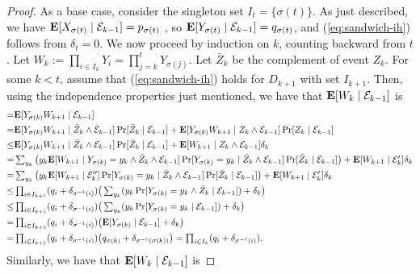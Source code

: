 \begin{proof}
As a base case, consider the singleton set $I_t=\{\sigma(t)\}$. As just described, we have $\text{\bf E}[X_{\sigma(t)}\mid\mathcal{E}_{k-1}]=p_{\sigma(t)}$ , so $\text{\bf E}[Y_{\sigma(t)}\mid\mathcal{E}_{k-1}]=q_{\sigma(t)}$, and (\ref{eq:sandwich-ih}) follows from $\delta_t=0$.
We now proceed by induction on $k$, counting backward from $t$. Let $W_k:=\prod_{i\in{I_k}} Y_i=\prod_{j=k}^t Y_{\sigma(j)}$. Let $\bar Z_k$ be the complement of event $Z_k$.  For some $k<t$, assume that (\ref{eq:sandwich-ih}) holds for $D_{k+1}$ with set $I_{k+1}$. Then, using the independence properties just mentioned, we have that $\text{\bf E}[W_k\mid\mathcal{E}_{k-1}]$ is
\begin{align*}
=&\text{\bf E}[Y_{\sigma(k)} W_{k+1}\mid\mathcal{E}_{k-1}] 
\\=& \text{\bf E}[Y_{\sigma(k)} W_{k+1}\mid\bar Z_k\land\mathcal{E}_{k-1}]\Pr[\bar Z_k\mid\mathcal{E}_{k-1}]
	+\text{\bf E}[Y_{\sigma(k)} W_{k+1}\mid Z_k\land\mathcal{E}_{k-1}]\Pr[Z_k\mid\mathcal{E}_{k-1}] 
\\\le& \text{\bf E}[Y_{\sigma(k)} W_{k+1}\mid\bar Z_k\land\mathcal{E}_{k-1}]\Pr[\bar Z_k\mid\mathcal{E}_{k-1}]
	+\text{\bf E}[W_{k+1}\mid Z_k\land\mathcal{E}_{k-1}]\delta_k 
\\ =&\textstyle\sum_{y_k}\left(y_k\text{\bf E}[W_{k+1}\mid Y_{\sigma(k)}=y_k\land \bar Z_k\land 
\mathcal{E}_{k-1}]
	\Pr[Y_{\sigma(k)}=y_k\mid\bar Z_k\land \mathcal{E}_{k-1}]
	\Pr[\bar Z_k\mid\mathcal{E}_{k-1}]\right)
	+ \text{\bf E}[W_{k+1}\mid\mathcal{E}_k']\delta_k 
\\ =&\textstyle\sum_{y_k}\left(y_k\text{\bf E}[W_{k+1}\mid \mathcal{E}_k'']
	\Pr[Y_{\sigma(k)}=y_k\mid\bar Z_k\land\mathcal{E}_{k-1}]
	\Pr[\bar Z_k\mid\mathcal{E}_{k-1}]\right)
	+ \text{\bf E}[W_{k+1}\mid\mathcal{E}_k']\delta_k 
\\ \le& \textstyle\prod_{i\in I_{k+1}}(q_i+\delta_{\sigma^{-1}(i)})
	\big(\sum_{y_k}(y_k\Pr[Y_{\sigma(k)}=y_k \land\bar Z_k\mid \mathcal{E}_{k-1}]
	) +\delta_k \big) 
\\ \le& \textstyle\prod_{i\in I_{k+1}}(q_i+\delta_{\sigma^{-1}(i)})
	\big(\sum_{y_k}(y_k\Pr[Y_{\sigma(k)}=y_k \mid \mathcal{E}_{k-1}]
	) +\delta_k \big) 
\\ =& \textstyle\prod_{i\in I_{k+1}}(q_i+\delta_{\sigma^{-1}(i)})
	\big(\text{\bf E}[Y_{\sigma(k)}\mid \mathcal{E}_{k-1}] +\delta_k\big) 
\\ =& \textstyle\prod_{i\in I_{k+1}}(q_i+\delta_{\sigma^{-1}(i)})
	\big(q_{\sigma(k)} + \delta_{\sigma^{-1}(\sigma(k))}\big) 
= \textstyle\prod_{i\in I_{k}}(q_i+\delta_{\sigma^{-1}(i)}).
\end{align*}
Similarly, we have that $\text{\bf E}[W_k\mid\mathcal{E}_{k-1}]$ is

\end{proof}
